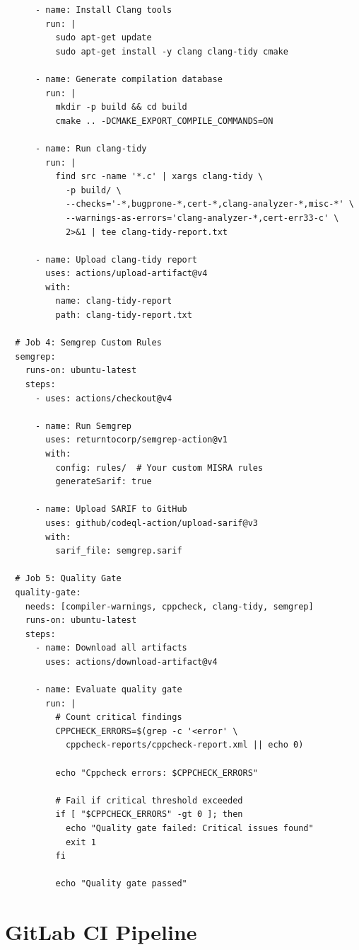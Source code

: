 \documentclass[11pt,letterpaper]{report}
\begin{document}
\begin{verbatim}
      - name: Install Clang tools
        run: |
          sudo apt-get update
          sudo apt-get install -y clang clang-tidy cmake

      - name: Generate compilation database
        run: |
          mkdir -p build && cd build
          cmake .. -DCMAKE_EXPORT_COMPILE_COMMANDS=ON

      - name: Run clang-tidy
        run: |
          find src -name '*.c' | xargs clang-tidy \
            -p build/ \
            --checks='-*,bugprone-*,cert-*,clang-analyzer-*,misc-*' \
            --warnings-as-errors='clang-analyzer-*,cert-err33-c' \
            2>&1 | tee clang-tidy-report.txt

      - name: Upload clang-tidy report
        uses: actions/upload-artifact@v4
        with:
          name: clang-tidy-report
          path: clang-tidy-report.txt

  # Job 4: Semgrep Custom Rules
  semgrep:
    runs-on: ubuntu-latest
    steps:
      - uses: actions/checkout@v4

      - name: Run Semgrep
        uses: returntocorp/semgrep-action@v1
        with:
          config: rules/  # Your custom MISRA rules
          generateSarif: true

      - name: Upload SARIF to GitHub
        uses: github/codeql-action/upload-sarif@v3
        with:
          sarif_file: semgrep.sarif

  # Job 5: Quality Gate
  quality-gate:
    needs: [compiler-warnings, cppcheck, clang-tidy, semgrep]
    runs-on: ubuntu-latest
    steps:
      - name: Download all artifacts
        uses: actions/download-artifact@v4

      - name: Evaluate quality gate
        run: |
          # Count critical findings
          CPPCHECK_ERRORS=$(grep -c '<error' \
            cppcheck-reports/cppcheck-report.xml || echo 0)

          echo "Cppcheck errors: $CPPCHECK_ERRORS"

          # Fail if critical threshold exceeded
          if [ "$CPPCHECK_ERRORS" -gt 0 ]; then
            echo "Quality gate failed: Critical issues found"
            exit 1
          fi

          echo "Quality gate passed"
\end{verbatim}

\section{GitLab CI Pipeline}
\end{document}
